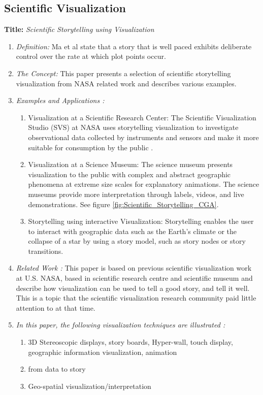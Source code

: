 \documentclass{egpubl}
\begin{document}
\subsection{Scientific Visualization}
\textbf{Title:} \textit{Scientific Storytelling using Visualization}
\begin{enumerate}
\item \textit{Definition:} Ma et al \cite{sci} state that a story that is well paced exhibits deliberate control over the rate at which plot points occur.
\item \textit{The Concept:} This paper presents a selection of scientific storytelling visualization from NASA related work and describes various examples.
\item  \textit{Examples and Applications :} 
\begin{enumerate}
\item Visualization at a Scientific Research Center: The Scientific Visualization Studio (SVS) at NASA uses storytelling visualization to investigate observational data collected by instruments and sensors and make it more suitable for consumption by the public \cite{nasa}\cite{svs1}.
\item Visualization at a Science Museum: The science museum presents visualization to the public with complex and abstract geographic phenomena at extreme size scales for explanatory animations. The science museums provide more interpretation through labels, videos, and live demonstrations. See figure \ref{fig:Scientific_Storytelling_CGA}\cite{sci}.
\item Storytelling using interactive Visualization: Storytelling enables the user to interact with geographic data such as the Earth's climate or the collapse of a star by using a story model, such as story nodes or story transitions\cite{Akiba}.
\end{enumerate}
\item \textit{Related Work :} This paper is based on previous scientific visualization work at U.S. NASA, based in scientific research centre and scientific museum and describe how  visualization can be used to tell a good story, and tell it well. This is a topic that the scientific visualization research community paid little attention to at that time.
\item \textit{In this paper, the following visualization techniques are illustrated :} 
\begin{enumerate}
\item 3D Stereoscopic displays, story boards, Hyper-wall, touch display, geographic information visualization, animation
\item from data to story
\item Geo-spatial visualization/interpretation
\end{enumerate}
\end{enumerate}
\end{document}
